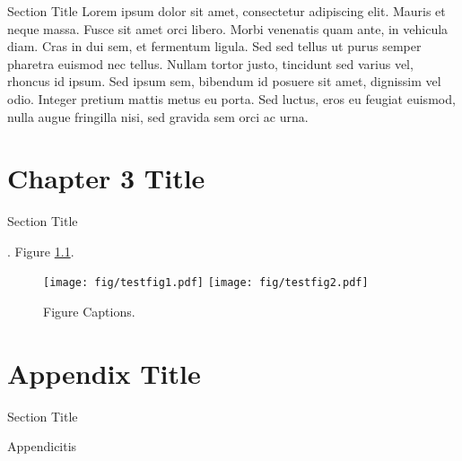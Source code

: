 \documentclass[twoside,12pt,draft]{sty/ucthesis-CA2012}
\begin{document}
\begin{mainmatter}
\begin{section}{Section Title}
Lorem ipsum dolor sit amet, consectetur adipiscing elit. Mauris et neque massa. Fusce sit amet orci libero. Morbi venenatis quam ante, in vehicula diam. Cras in dui sem, et fermentum ligula. Sed sed tellus ut purus semper pharetra euismod nec tellus. Nullam tortor justo, tincidunt sed varius vel, rhoncus id ipsum. Sed ipsum sem, bibendum id posuere sit amet, dignissim vel odio. Integer pretium mattis metus eu porta. Sed luctus, eros eu feugiat euismod, nulla augue fringilla nisi, sed gravida sem orci ac urna.

\end{section}

\chapter{Chapter 3 Title}
\begin{section}{Section Title}

\cite{Maldacena:1997re,joesbook}. Figure \ref{fig:label}.

\begin{figure}[t]
\centerline{\texttt{[image: fig/testfig1.pdf]}
\hspace{1cm}\texttt{[image: fig/testfig2.pdf]}}
\caption{Figure Captions.}
\label{fig:label}
\end{figure}

\end{section}



\appendix

\dsp

\chapter{Appendix Title }{\label{appendix:a}}
\begin{section}{Section Title}

Appendicitis

\end{section}
\end{mainmatter}

\ssp
%

\end{document}
